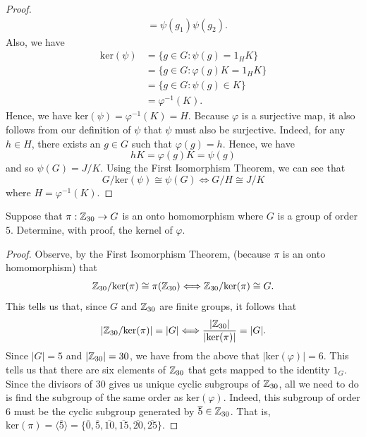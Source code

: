 \documentclass[a4paper]{article}
\begin{document}
\begin{problem}
\begin{enumerate}
\begin{proof}
\begin{align*}
                                                                  &= \psi({g}_{1}) \psi({g}_{2}).
            \end{align*}
            Also, we have 
            \begin{align*}
                \text{ker}(\psi) &= \{ g \in G : \psi(g) = {1}_{H} K  \} \\
                                 &= \{ g \in G : \varphi(g) K = {1}_{H}  K  \}  \\
                                 &= \{  g \in G : \psi(g) \in K \}  \\
                                 &= \varphi^{-1}(K).
            \end{align*}
            Hence, we have \( \text{ker}(\psi) = \varphi^{-1}(K) = H  \). Because \( \varphi  \) is a surjective map, it also follows from our definition of \( \psi  \) that \( \psi  \) must also be surjective. Indeed, for any \( h \in H  \), there exists an \( g \in G  \) such that \( \varphi(g) = h  \). Hence, we have  
            \[  h K = \varphi(g) K  = \psi(g) \]
            and so \( \psi(G) = J / K  \).
            Using the First Isomorphism Theorem, we can see that 
            \[  G / \text{ker}(\psi) \cong \psi(G) \iff G / H  \cong J / K   \]
            where \( H = \varphi^{-1}(K)  \).

            \end{proof}
    \end{enumerate}
\end{problem}

\begin{problem}
   Suppose that \( \pi : {\mathbb{Z}}_{30} \to G  \) is an onto homomorphism where \( G  \) is a group of order \( 5  \). Determine, with proof, the kernel of \( \varphi \). 
\end{problem}
\begin{proof}
Observe, by the First Isomorphism Theorem, (because \( \pi  \) is an onto homomorphism) that  
\[  {\mathbb{Z}}_{30} / \text{ker}(\pi) \cong \pi({\mathbb{Z}}_{30}) \Longleftrightarrow {\ensuremath{\mathbb{Z}}}_{30} / \text{ker}(\pi) \cong G.     \]
This tells us that, since \( G  \) and \( \mathbb{Z}_{30} \) are finite groups, it follows that 
\[  | {\mathbb{Z}}_{30} / \text{ker}(\pi) |  = | G  |  \Longleftrightarrow \frac{ | {\mathbb{Z}}_{30} |  }{ |  \text{ker}(\pi) |  } = | G  |.   \]
Since \( | G  |  = 5  \) and \( | {\mathbb{Z}}_{30} | = 30  \), we have from the above that \( | \text{ker}(\varphi) | = 6   \). This tells us that there are six elements of \( {\mathbb{Z}}_{30} \) that gets mapped to the identity \( {1}_{G} \). Since the divisors of \( 30  \) gives us unique cyclic subgroups of \( {\mathbb{Z}}_{30} \), all we need to do is find the subgroup of the same order as \( \text{ker}(\varphi) \). Indeed, this subgroup of order \( 6  \) must be the cyclic subgroup generated by \( \overline{5} \in {\ensuremath{\mathbb{Z}}}_{30}\). That is, \( \text{ker}(\pi) = \langle  \overline{5} \rangle = \{  \overline{0}, \overline{5}, \overline{10}, \overline{15}, \overline{20}, \overline{25} \}   \).
\end{proof}
\end{document}
